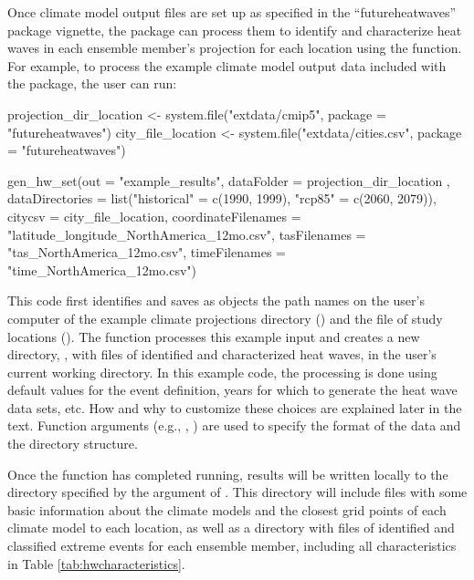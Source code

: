 Once climate model output files are set up as specified in the
``futureheatwaves'' package vignette, the package can process them to
identify and characterize heat waves in each ensemble member's
projection for each location using the  function. For
example, to process the example climate model output data included with
the package, the user can run:

\begin{Schunk}
\begin{Sinput}
projection_dir_location <- system.file("extdata/cmip5",
                                       package = "futureheatwaves")
city_file_location <- system.file("extdata/cities.csv",
                                  package = "futureheatwaves")

gen_hw_set(out = "example_results",
           dataFolder = projection_dir_location ,
           dataDirectories = list("historical" = c(1990, 1999),
                                        "rcp85" = c(2060, 2079)),
           citycsv = city_file_location,
           coordinateFilenames = "latitude_longitude_NorthAmerica_12mo.csv",
           tasFilenames = "tas_NorthAmerica_12mo.csv",
           timeFilenames = "time_NorthAmerica_12mo.csv")
\end{Sinput}
\end{Schunk}

This code first identifies and saves as objects the path names on the
user's computer of the example climate projections directory
() and the file of study locations
(). The  function
processes this example input and creates a new directory,
, with files of identified and characterized heat
waves, in the user's current working directory. In this example code,
the processing is done using default values for the event definition,
years for which to generate the heat wave data sets, etc. How and why to
customize these choices are explained later in the text. Function
arguments (e.g., , ) are used
to specify the format of the data and the directory structure.

Once the function has completed running, results will be written locally
to the directory specified by the  argument of
. This directory will include files with some basic
information about the climate models and the closest grid points of each
climate model to each location, as well as a directory with files of
identified and classified extreme events for each ensemble member,
including all characteristics in Table \ref{tab:hwcharacteristics}.

